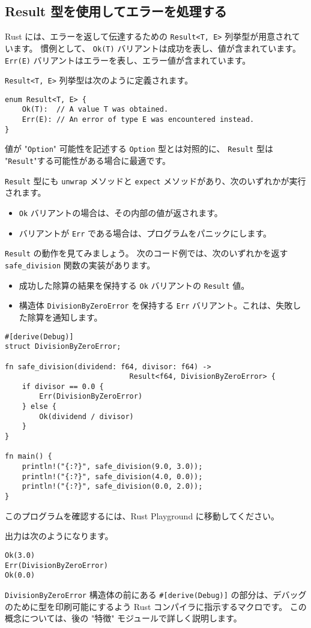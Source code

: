 \subsection{Result 型を使用してエラーを処理する}

Rust には、エラーを返して伝達するための \texttt{Result<T, E>} 列挙型が用意されています。 慣例として、 \texttt{Ok(T)} バリアントは成功を表し、値が含まれています。 \texttt{Err(E)} バリアントはエラーを表し、エラー値が含まれています。

\texttt{Result<T, E>} 列挙型は次のように定義されます。


\begin{lstlisting}[numbers=none]
enum Result<T, E> {
    Ok(T):  // A value T was obtained.
    Err(E): // An error of type E was encountered instead.
}
\end{lstlisting}

値が "\texttt{Option}" 可能性を記述する \texttt{Option} 型とは対照的に、 \texttt{Result} 型は "\texttt{Result}"する可能性がある場合に最適です。

\texttt{Result} 型にも \texttt{unwrap} メソッドと \texttt{expect} メソッドがあり、次のいずれかが実行されます。

\begin{itemize}
\item \texttt{Ok} バリアントの場合は、その内部の値が返されます。
\item バリアントが \texttt{Err} である場合は、プログラムをパニックにします。
\end{itemize}

\texttt{Result} の動作を見てみましょう。 次のコード例では、次のいずれかを返す \texttt{safe\_division} 関数の実装があります。

\begin{itemize}
\item 成功した除算の結果を保持する \texttt{Ok} バリアントの \texttt{Result} 値。
\item 構造体 \texttt{DivisionByZeroError} を保持する \texttt{Err} バリアント。これは、失敗した除算を通知します。
\end{itemize}

\begin{lstlisting}[numbers=none]
#[derive(Debug)]
struct DivisionByZeroError;

fn safe_division(dividend: f64, divisor: f64) ->
                             Result<f64, DivisionByZeroError> {
    if divisor == 0.0 {
        Err(DivisionByZeroError)
    } else {
        Ok(dividend / divisor)
    }
}

fn main() {
    println!("{:?}", safe_division(9.0, 3.0));
    println!("{:?}", safe_division(4.0, 0.0));
    println!("{:?}", safe_division(0.0, 2.0));
}
\end{lstlisting}

このプログラムを確認するには、Rust Playground に移動してください。

出力は次のようになります。

\begin{lstlisting}[numbers=none]
Ok(3.0)
Err(DivisionByZeroError)
Ok(0.0)
\end{lstlisting}

\texttt{DivisionByZeroError} 構造体の前にある \texttt{\#[derive(Debug)]} の部分は、デバッグのために型を印刷可能にするよう Rust コンパイラに指示するマクロです。 この概念については、後の "特徴" モジュールで詳しく説明します。